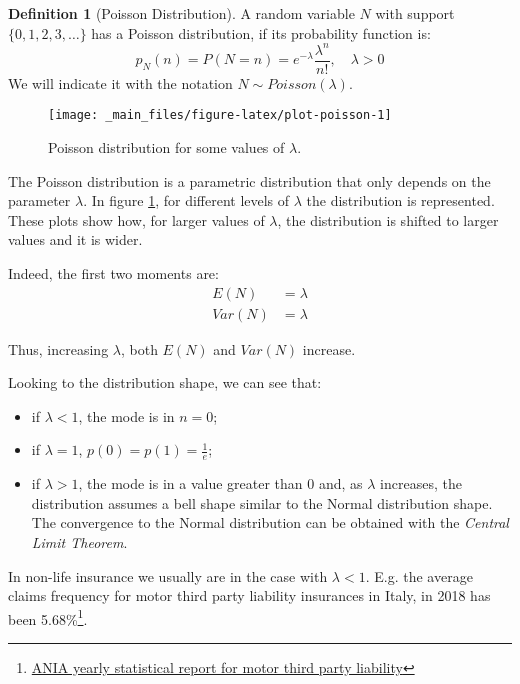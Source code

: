 \documentclass[a4paper, twoside, openright, 12pt]{report}
\providecommand{\tightlist}{%
  \setlength{\itemsep}{0pt}\setlength{\parskip}{0pt}}
\theoremstyle{definition}
\newtheorem{definition}{Definition}[chapter]
\theoremstyle{definition}
\theoremstyle{definition}
\theoremstyle{remark}
\begin{document}
\begin{definition}[Poisson Distribution]
\label{def:def-poisson} \iffalse (Poisson Distribution) \fi{} A random variable \(N\) with support \(\{0,1,2,3,\dots \}\) has a Poisson distribution, if its probability function is:
\[
p_N(n) = P\left( N = n \right) = e^{-\lambda}\frac{\lambda^n}{n!}, \quad \lambda>0
\]
We will indicate it with the notation \(N \sim Poisson(\lambda)\).
\end{definition}

\begin{figure}[!hbtp]

{\centering \texttt{[image: \_main\_files/figure-latex/plot-poisson-1]} 

}

\caption{Poisson distribution for some values of $\lambda$.}\label{fig:plot-poisson}
\end{figure}

The Poisson distribution is a parametric distribution that only depends on the parameter \(\lambda\). In figure \ref{fig:plot-poisson}, for different levels of \(\lambda\) the distribution is represented. These plots show how, for larger values of \(\lambda\), the distribution is shifted to larger values and it is wider.

Indeed, the first two moments are:
\begin{align*}
E(N)   & = \lambda \\
Var(N) & = \lambda
\end{align*}

Thus, increasing \(\lambda\), both \(E(N)\) and \(Var(N)\) increase.

Looking to the distribution shape, we can see that:

\begin{itemize}
\tightlist
\item
  if \(\lambda<1\), the mode is in \(n=0\);
\item
  if \(\lambda=1\), \(p(0)=p(1)=\frac{1}{e}\);
\item
  if \(\lambda>1\), the mode is in a value greater than \(0\) and, as \(\lambda\) increases, the distribution assumes a bell shape similar to the Normal distribution shape. The convergence to the Normal distribution can be obtained with the \emph{Central Limit Theorem}.
\end{itemize}

In non-life insurance we usually are in the case with \(\lambda<1\). E.g. the average claims frequency for motor third party liability insurances in Italy, in 2018 has been 5.68\%\footnote{\href{https://www.ania.it/ricerca-avanzata/-/asset_publisher/XIyLeujL9irt/content/id/113283}{ANIA yearly statistical report for motor third party liability}}.
\end{document}

